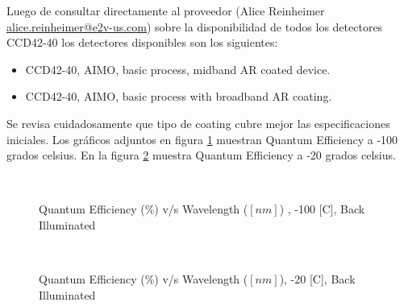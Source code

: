 \documentclass[a4paper,10pt]{article}
\begin{document}
Luego de consultar directamente al proveedor (Alice Reinheimer
\url{alice.reinheimer@e2v-us.com}) sobre la disponibilidad de todos los
detectores CCD42-40 los detectores disponibles son los siguientes:

\begin{itemize} 
\item CCD42-40, AIMO, basic process, midband AR coated device.
\item CCD42-40, AIMO, basic process with broadband AR coating.
\end{itemize}

Se revisa cuidadosamente que tipo de coating cubre mejor las especificaciones
iniciales. Los gráficos adjuntos en figura \ref{fig:qe100} muestran Quantum
Efficiency a -100 grados celsius. En la figura \ref{fig:qe20} muestra Quantum
Efficiency a -20 grados celsius.

\begin{figure}[ht!]
  \centering
  ~ 
  \caption{Quantum Efficiency (\%) v/s Wavelength ($[nm]$) , -100 [C], Back Illuminated}
  \label{fig:qe100}
\end{figure}

\begin{figure}[ht!]
  \centering
  ~ 
  \caption{Quantum Efficiency (\%) v/s Wavelength ($[nm]$), -20 [C], Back Illuminated}
  \label{fig:qe20}
\end{figure}
 
\end{document}
